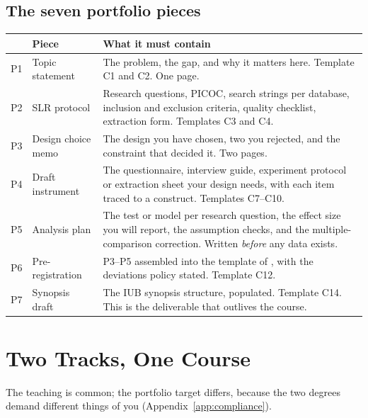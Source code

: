 \subsection*{The seven portfolio pieces}

\begin{center}
\small
\begin{tabular}{@{}cL{4.0cm}L{9.3cm}@{}}
\toprule
 & \textbf{Piece} & \textbf{What it must contain} \\
\midrule
P1 & Topic statement & The problem, the gap, and why it matters here.
     Template C1 and C2. One page. \\
P2 & SLR protocol & Research questions, PICOC, search strings per database,
     inclusion and exclusion criteria, quality checklist, extraction form.
     Templates C3 and C4. \\
P3 & Design choice memo & The design you have chosen, two you rejected, and
     the constraint that decided it. Two pages. \\
P4 & Draft instrument & The questionnaire, interview guide, experiment
     protocol or extraction sheet your design needs, with each item traced to
     a construct. Templates C7--C10. \\
P5 & Analysis plan & The test or model per research question, the effect size
     you will report, the assumption checks, and the multiple-comparison
     correction. Written \emph{before} any data exists. \\
P6 & Pre-registration & P3--P5 assembled into the template of ,
     with the deviations policy stated. Template C12. \\
P7 & Synopsis draft & The IUB synopsis structure, populated. Template C14.
     This is the deliverable that outlives the course. \\
\bottomrule
\end{tabular}
\end{center}

\section{Two Tracks, One Course}

The teaching is common; the portfolio target differs, because the two degrees
demand different things of you (Appendix~\ref{app:compliance}).

